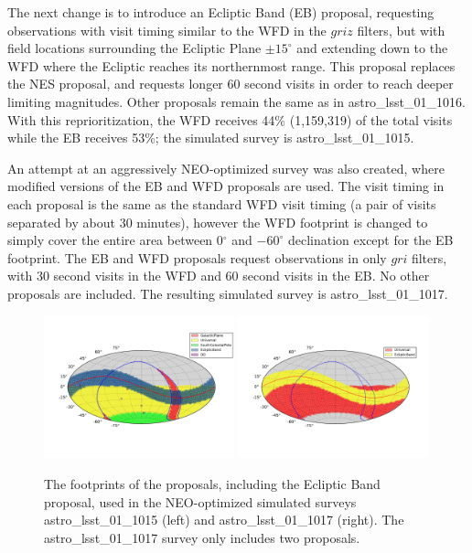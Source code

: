 The next change is to introduce an Ecliptic Band (EB) proposal, requesting observations with visit timing similar to the WFD in the $griz$ filters, but with field locations surrounding the Ecliptic Plane $\pm15^\circ$ and extending down to the WFD where the Ecliptic reaches its northernmost  range. This proposal replaces the NES proposal, and requests longer 60 second visits in order to reach deeper limiting magnitudes. Other proposals remain the same as in astro\_lsst\_01\_1016. With this reprioritization, the WFD receives 44\% (1,159,319) of the total visits while the EB receives 53\%; the simulated survey is astro\_lsst\_01\_1015. 

An attempt at an aggressively NEO-optimized survey was also created, where modified versions of the EB and WFD proposals are used. The visit timing in each proposal is the same as the standard WFD visit timing (a pair of visits separated by about 30 minutes), however the WFD footprint is changed to simply cover the entire area between 0$^\circ$ and $-60^\circ$ declination except for the EB footprint. The EB and WFD proposals request observations in only $gri$ filters, with 30 second visits in the WFD and 60 second visits in the EB. No other proposals are included. The resulting simulated survey is astro\_lsst\_01\_1017. 

\begin{figure}[t!]
\centering
\includegraphics[width=0.49\textwidth]{figures/astro_lsst_01_1015_proposal_footprint}
\includegraphics[width=0.49\textwidth]{figures/astro_lsst_01_1017_proposal_footprint}
\vskip -0.5in 
\caption{The footprints of the proposals, including the Ecliptic Band proposal, used in the NEO-optimized simulated surveys astro\_lsst\_01\_1015 (left) and astro\_lsst\_01\_1017 (right). The astro\_lsst\_01\_1017 survey only includes two proposals.
\label{fig:neo_footprints}}
\end{figure}


